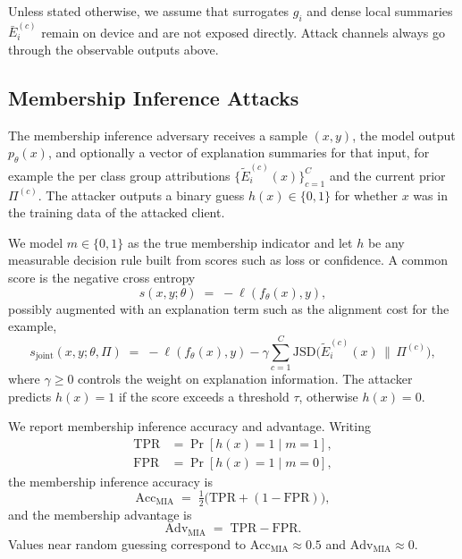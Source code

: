 \documentclass{article}
\theoremstyle{plain}
\theoremstyle{definition}
\theoremstyle{remark}
\begin{document}
Unless stated otherwise, we assume that surrogates $g_i$ and dense local summaries $\bar{E}_i^{(c)}$ remain on device and are not exposed directly. Attack channels always go through the observable outputs above.

\subsection{Membership Inference Attacks}
\label{sec:threat-mia}

The membership inference adversary receives a sample $(x,y)$, the model output $p_\theta(x)$, and optionally a vector of explanation summaries for that input, for example the per class group attributions $\{\tilde{E}_i^{(c)}(x)\}_{c=1}^{C}$ and the current prior $\Pi^{(c)}$. The attacker outputs a binary guess $h(x) \in \{0,1\}$ for whether $x$ was in the training data of the attacked client.

We model $m \in \{0,1\}$ as the true membership indicator and let $h$ be any measurable decision rule built from scores such as loss or confidence. A common score is the negative cross entropy
\begin{equation}
\label{eq:mia-score}
s(x,y;\theta) \;=\; -\ell(f_\theta(x),y),
\end{equation}
possibly augmented with an explanation term such as the alignment cost for the example,
\begin{equation}
\label{eq:mia-score-expl}
s_{\text{joint}}(x,y;\theta,\Pi) \;=\; -\ell(f_\theta(x),y) 
- \gamma \sum_{c=1}^{C} \mathrm{JSD}\!\big(\tilde{E}_i^{(c)}(x)\,\big\|\,\Pi^{(c)}\big),
\end{equation}
where $\gamma \ge 0$ controls the weight on explanation information. The attacker predicts $h(x)=1$ if the score exceeds a threshold $\tau$, otherwise $h(x)=0$.

We report membership inference accuracy and advantage. Writing
\begin{align}
\mathrm{TPR} &= \Pr[h(x)=1 \mid m=1], \\
\mathrm{FPR} &= \Pr[h(x)=1 \mid m=0], 
\end{align}
the membership inference accuracy is
\begin{equation}
\label{eq:mia-acc-app}
\mathrm{Acc}_{\mathrm{MIA}} \;=\; \tfrac{1}{2}\big(\mathrm{TPR} + (1 - \mathrm{FPR})\big),
\end{equation}
and the membership advantage is
\begin{equation}
\label{eq:mia-adv}
\mathrm{Adv}_{\mathrm{MIA}} \;=\; \mathrm{TPR} - \mathrm{FPR}.
\end{equation}
Values near random guessing correspond to $\mathrm{Acc}_{\mathrm{MIA}}\approx 0.5$ and $\mathrm{Adv}_{\mathrm{MIA}}\approx 0$.
\end{document}
